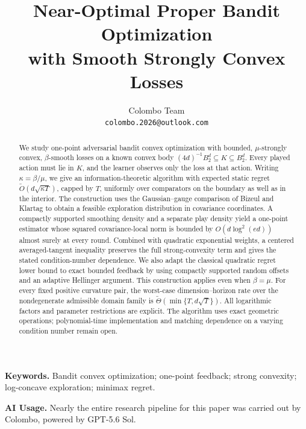 \documentclass[11pt]{article}
\title{Near-Optimal Proper Bandit Optimization\\with Smooth Strongly Convex Losses}
\author{Colombo Team\\[3pt]\texttt{colombo.2026@outlook.com}}
\date{}
\numberwithin{equation}{section}
\newcounter{algorithm}
\theoremstyle{definition}
\theoremstyle{remark}
\begin{document}
\maketitle
\begin{abstract}
We study one-point adversarial bandit convex optimization with bounded,
$\mu$-strongly convex, $\beta$-smooth losses on a known convex body
$(4d)^{-1}B_2^d\subseteq K\subseteq B_2^d$. Every played action must lie in
$K$, and the learner observes only the loss at that action. Writing
$\kappa=\beta/\mu$, we give an information-theoretic algorithm with expected
static regret $\widetilde O(d\sqrt{\kappa T})$, capped by $T$, uniformly over
comparators on the boundary as well as in the interior. The construction uses
the Gaussian--gauge comparison of Bizeul and Klartag to obtain a feasible
exploration distribution in covariance coordinates. A compactly supported
smoothing density and a separate play density yield a one-point estimator
whose squared covariance-local norm is bounded by $O(d\log^2(ed))$ almost
surely at every round. Combined with quadratic exponential weights, a centered
averaged-tangent inequality preserves the full strong-convexity term and gives
the stated condition-number dependence. We also adapt the classical quadratic
regret lower bound to exact bounded feedback by using compactly supported
random offsets and an adaptive Hellinger argument. This construction applies
even when $\beta=\mu$. For every fixed positive curvature pair, the worst-case
dimension--horizon rate over the nondegenerate admissible domain family is
$\widetilde\Theta(\min\{T,d\sqrt T\})$. All logarithmic factors and parameter
restrictions are explicit. The algorithm uses exact geometric operations;
polynomial-time implementation and matching dependence on a varying condition
number remain open.
\end{abstract}

\noindent\textbf{Keywords.}
Bandit convex optimization; one-point feedback; strong convexity;
log-concave exploration; minimax regret.

\begin{samepage}
\noindent\textbf{AI Usage.}
Nearly the entire research pipeline for this paper was carried out by
Colombo, powered by GPT-5.6 Sol. 
\par
\end{samepage}
\end{document}
